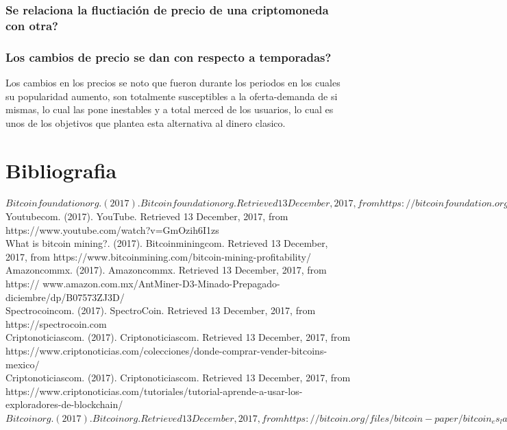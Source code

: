 \documentclass[12pt,letterpaper]{article}
\begin{document}
	\subsubsection*{Se relaciona la fluctiaci\'on de precio de una criptomoneda con otra?}
	
	\subsubsection*{Los cambios de precio se dan con respecto a temporadas?}
	Los cambios en los precios se noto que fueron durante los periodos en los cuales su popularidad aumento, son totalmente susceptibles a la oferta-demanda de si mismas, lo cual las pone inestables y a total merced de los usuarios, lo cual es unos de los objetivos que plantea esta alternativa al dinero clasico.
\section{Bibliografia}
$
Bitcoinfoundationorg. (2017). Bitcoinfoundationorg. Retrieved 13 December, 2017, from https://bitcoinfoundation.org/wp-content/uploads/2017/03/Bitcoin_Foundation_Manifesto.pdf
$
\\
Youtubecom. (2017). YouTube. Retrieved 13 December, 2017, from https://www.youtube.com/watch?v=GmOzih6I1zs
\\

What is bitcoin mining?. (2017). Bitcoinminingcom. Retrieved 13 December, 2017, from https://www.bitcoinmining.com/bitcoin-mining-profitability/
\\

Amazoncommx. (2017). Amazoncommx. Retrieved 13 December, 2017, from https://
www.amazon.com.mx/AntMiner-D3-Minado-Prepagado-diciembre/dp/B07573ZJ3D/
\\

Spectrocoincom. (2017). SpectroCoin. Retrieved 13 December, 2017, from https://spectrocoin.com
\\

Criptonoticiascom. (2017). Criptonoticiascom. Retrieved 13 December, 2017, from https://www.criptonoticias.com/colecciones/donde-comprar-vender-bitcoins-mexico/
\\

Criptonoticiascom. (2017). Criptonoticiascom. Retrieved 13 December, 2017, from https://www.criptonoticias.com/tutoriales/tutorial-aprende-a-usar-los-exploradores-de-blockchain/
\\
$
Bitcoinorg. (2017). Bitcoinorg. Retrieved 13 December, 2017, from https://
bitcoin.org/files/bitcoin-paper/bitcoin_es_latam.pdf$
\\
\end{document}
